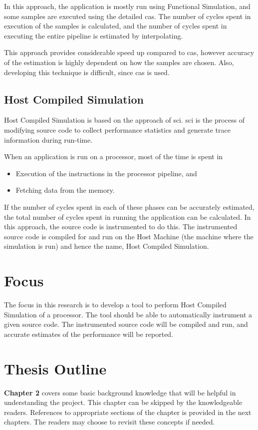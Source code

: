 In this approach, the application is mostly run using Functional Simulation, and some samples are executed using the detailed \gls{cas}. The number of cycles spent in execution of the samples is calculated, and the number of cycles spent in executing the entire pipeline is estimated by interpolating.

This approach provides considerable speed up compared to \gls{cas}, however accuracy of the estimation is highly dependent on how the samples are chosen. Also, developing this technique is difficult, since \gls{cas} is used.


\subsection{Host Compiled Simulation}
Host Compiled Simulation is based on the approach of \gls{sci}. \gls{sci} is the process of modifying source code to collect performance statistics and generate trace information during run-time. 

When an application is run on a processor, most of the time is spent in 
\begin{itemize} \itemsep -6pt
\item Execution of the instructions in the processor pipeline, and 
\item Fetching data from the memory. 
\end{itemize}

If the number of cycles spent in each of these phases can be accurately estimated, the total number of cycles spent in running the application can be calculated.  In this approach, the source code is instrumented to do this. The instrumented source code is compiled for and run on the Host Machine (the machine where the simulation is run) and hence the name, Host Compiled Simulation.

\section{Focus}
The focus in this research is to develop a tool to perform Host Compiled Simulation of a processor. The tool should be able to automatically instrument a given source code. The instrumented source code will be compiled and run, and accurate estimates of the performance will be reported.

\section{Thesis Outline}
\textbf{Chapter 2} covers some basic background knowledge that will be helpful in understanding the project. This chapter can be skipped by the knowledgeable readers. References to appropriate sections of the chapter is provided in the next chapters. The readers may choose to revisit these concepts if needed.

